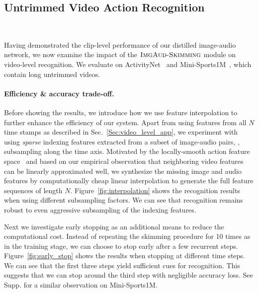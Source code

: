 \vspace{-0.05in}
\subsection{Untrimmed Video Action Recognition}~\label{Sec:video_level_results}
\vspace{-0.2in}

Having demonstrated the clip-level performance of our distilled image-audio network, we now examine the impact of the $\textsc{ImgAud-Skimming}$ module on video-level recognition. We evaluate on ActivityNet~\cite{caba2015activitynet} and Mini-Sports1M~\cite{karpathy2014large}, which contain long untrimmed videos. 

\vspace{-0.05in}
\paragraph{Efficiency \& accuracy trade-off.} 
Before showing the results, we introduce how we use feature interpolation to further enhance the efficiency of our system. Apart from using features from all $N$ time stamps as described in Sec.~\ref{Sec:video_level_app}, we experiment with using \emph{sparse} indexing features extracted from a subset of image-audio pairs, \ie, subsampling along the time axis. Motivated by the locally-smooth action feature space~\cite{Dwibedi_2019_CVPR} and based on our empirical observation that neighboring video features can be linearly approximated well, we synthesize the missing image and audio features by computationally cheap linear interpolation to generate the full feature sequences of length $N$. Figure~\ref{fig:interpolation} shows the recognition results when using different subsampling factors. We can see that recognition remains robust to even aggressive subsampling of the indexing features.

Next we investigate early stopping as an additional means to reduce the computational cost. Instead of repeating the skimming procedure for 10 times as in the training stage, we can choose to stop early after a few recurrent steps. Figure~\ref{fig:early_stop} shows the results when stopping at different time steps. We can see that the first three steps yield sufficient cues for recognition. This suggests that we can stop around the third step with negligible accuracy loss. See Supp. for a similar observation on Mini-Sports1M.

